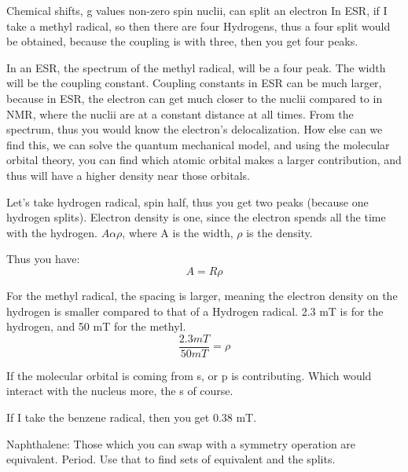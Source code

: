 	Chemical shifts, g values
	non-zero spin nuclii, can split an electron
	In ESR, if I take a methyl radical, so then there are four Hydrogens, thus a four split would be obtained, because the coupling is with three, then you get four peaks.
	\par
	In an ESR, the spectrum of the methyl radical, will be a four peak. The width will be the coupling constant. Coupling constants in ESR can be much larger, because in ESR, the electron can get much closer to the nuclii compared to in NMR, where the nuclii are at a constant distance at all times. From the spectrum, thus you would know the electron's delocalization. How else can we find this, we can solve the quantum mechanical model, and using the molecular orbital theory, you can find which atomic orbital makes a larger contribution, and thus will have a higher density near those orbitals.
	\par
	Let's take hydrogen radical, spin half, thus you get two peaks (because one hydrogen splits). Electron density is one, since the electron spends all the time with the hydrogen. $A \alpha \rho$, where A is the width, $\rho$ is the density.
	\par
	Thus you have:
	\begin{equation}
		A=R\rho
	\end{equation}
	\par
	For the methyl radical, the spacing is larger, meaning the electron density on the hydrogen is smaller compared to that of a Hydrogen radical. 2.3 mT is for the hydrogen, and 50 mT for the methyl.
	\begin{equation}
		\frac{2.3 mT}{50 mT}=\rho
	\end{equation}

	If the molecular orbital is coming from s, or p is contributing. Which would interact with the nucleus more, the s of course.

	\par
	If I take the benzene radical, then you get 0.38 mT.
	\par
	Naphthalene: Those which you can swap with a symmetry operation are equivalent. Period. Use that to find sets of equivalent and the splits.
